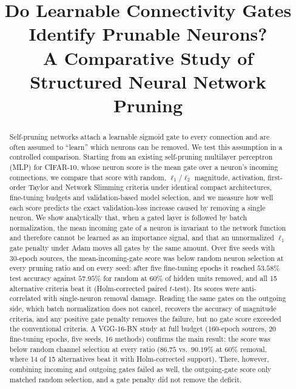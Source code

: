 \documentclass[conference]{IEEEtran}
\begin{document}
\title{Do Learnable Connectivity Gates Identify Prunable Neurons?\\
A Comparative Study of Structured Neural Network Pruning}

\author{
}

\maketitle

\begin{abstract}
Self-pruning networks attach a learnable sigmoid gate to every connection and are often
assumed to ``learn'' which neurons can be removed. We test this assumption in a
controlled comparison. Starting from an existing self-pruning multilayer perceptron
(MLP) for CIFAR-10, whose neuron score is the mean gate over a neuron's incoming
connections, we compare that score with random, $\ell_1$/$\ell_2$ magnitude,
activation, first-order Taylor and Network Slimming criteria under identical compact
architectures, fine-tuning budgets and validation-based model selection, and we measure
how well each score predicts the exact validation-loss increase caused by removing a
single neuron. We show analytically that, when a gated layer is followed by batch
normalization, the mean incoming gate of a neuron is invariant to the network function
and therefore cannot be learned as an importance signal, and that an unnormalized
$\ell_1$ gate penalty under Adam moves all gates by the same amount. Over five seeds with
30-epoch sources, the mean-incoming-gate score was below random neuron selection at every
pruning ratio and on every seed: after five fine-tuning epochs it reached $53.58\%$ test
accuracy against $57.95\%$ for random at $60\%$ of hidden units removed, and all 15
alternative criteria beat it (Holm-corrected paired $t$-test). Its scores were
anti-correlated with single-neuron removal damage. Reading the same gates on the outgoing
side, which batch normalization does not cancel, recovers the accuracy of magnitude
criteria, and any positive gate penalty removes the failure, but no gate score exceeded
the conventional criteria. A VGG-16-BN study at full budget (160-epoch sources, 20
fine-tuning epochs, five seeds, 16 methods) confirms the main result: the score was below
random channel selection at every ratio ($86.75$ vs.\ $90.19\%$ at $60\%$ removal, where
14 of 15 alternatives beat it with Holm-corrected support). There, however, combining
incoming and outgoing gates failed as well, the outgoing-gate score only matched random
selection, and a gate penalty did not remove the deficit.
\end{abstract}
\end{document}
